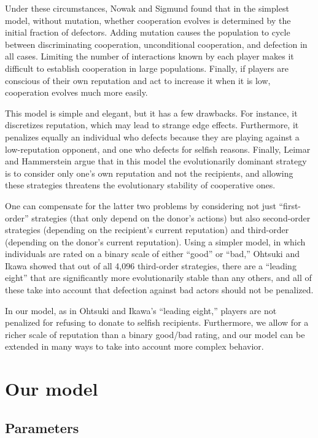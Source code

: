 \documentclass{amsart}
\begin{document}
Under these circumstances, Nowak and Sigmund found that in the
simplest model, without mutation, whether cooperation evolves is
determined by the initial fraction of defectors. Adding mutation
causes the population to cycle between discriminating cooperation,
unconditional cooperation, and defection in all cases. Limiting the
number of interactions known by each player makes it difficult to
establish cooperation in large populations. Finally, if players are
conscious of their own reputation and act to increase it when it is
low, cooperation evolves much more easily.

This model is simple and elegant, but it has a few drawbacks. For
instance, it discretizes reputation, which may lead to strange edge
effects. Furthermore, it penalizes equally an individual who defects
because they are playing against a low-reputation opponent, and one
who defects for selfish reasons. Finally, Leimar and Hammerstein
\cite{leimar_evolution_2001} argue that in this model the
evolutionarily dominant strategy is to consider only one's own
reputation and not the recipients, and allowing these strategies
threatens the evolutionary stability of cooperative ones.

One can compensate for the latter two problems by considering not just
``first-order'' strategies (that only depend on the donor's actions)
but also second-order strategies (depending on the recipient's current
reputation) and third-order (depending on the donor's current
reputation).  Using a simpler model, in which individuals are rated on
a binary scale of either ``good'' or ``bad,'' Ohtsuki and Ikawa
\cite{ohtsuki_how_2004} showed that out of all 4,096 third-order
strategies, there are a ``leading eight'' that are significantly more
evolutionarily stable than any others, and all of these take into
account that defection against bad actors should not be penalized.

In our model, as in Ohtsuki and Ikawa's ``leading eight,'' players are
not penalized for refusing to donate to selfish recipients.
Furthermore, we allow for a richer scale of reputation than a binary
good/bad rating, and our model can be extended in many ways to take
into account more complex behavior.

\section{Our model}
\label{sec:model}

\subsection{Parameters}
\end{document}
